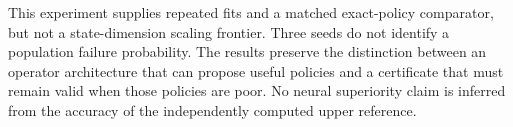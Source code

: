 This experiment supplies repeated fits and a matched exact-policy comparator, but not a state-dimension scaling frontier. Three seeds do not identify a population failure probability. The results preserve the distinction between an operator architecture that can propose useful policies and a certificate that must remain valid when those policies are poor. No neural superiority claim is inferred from the accuracy of the independently computed upper reference.
